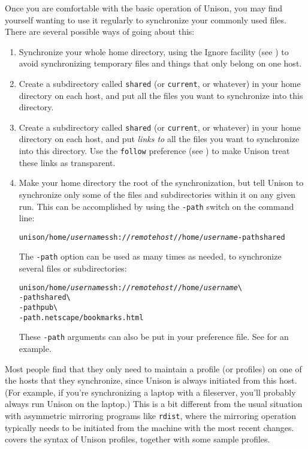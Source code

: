 \documentclass{article}
\newcommand{\NT}[1]{\textit{#1}}
\begin{document}

Once you are comfortable with the basic operation of Unison, you may
find yourself wanting to use it regularly to synchronize your commonly
used files.  There are several possible ways of going about this:

\begin{enumerate}
\item Synchronize your whole home directory, using the Ignore facility
(see )
to avoid synchronizing temporary files and things that only belong on
one host.
\item Create a subdirectory called {\tt shared} (or {\tt current}, or
whatever) in your home directory on each host, and put all the files
you want to synchronize into this directory.
\item Create a subdirectory called {\tt shared} (or {\tt current}, or
whatever) in your home directory on each host, and put {\em links to}
all the files you want to synchronize into this directory.  Use the
{\tt follow} preference (see ) to make
Unison treat these links as transparent.
\item Make your home directory the root of the synchronization, but
tell Unison to synchronize only some of the files and subdirectories
within it on any given run.  This can be accomplished by using the {\tt -path} switch
on the command line:
\begin{alltt}
       unison /home/\NT{username} ssh://\NT{remotehost}//home/\NT{username} -path shared
\end{alltt}
The {\tt -path} option can be used as many times as needed, to
synchronize several files or subdirectories:
\begin{alltt}
       unison /home/\NT{username} ssh://\NT{remotehost}//home/\NT{username} \verb|\|
          -path shared \verb|\|
          -path pub \verb|\|
          -path .netscape/bookmarks.html
\end{alltt}
These \verb|-path| arguments can also be put in your preference file.
See  for an example.
\end{enumerate}

Most people find that they only need to maintain a profile (or
profiles) on one of the hosts that they synchronize, since Unison is
always initiated from this host.  (For example, if you're
synchronizing a laptop with a fileserver, you'll probably always run
Unison on the laptop.)  This is a bit different from the usual
situation with asymmetric mirroring programs like \verb|rdist|, where
the mirroring operation typically needs to be initiated from the
machine with the most recent changes.  
covers the syntax of Unison profiles, together with some sample profiles.
\end{document}
